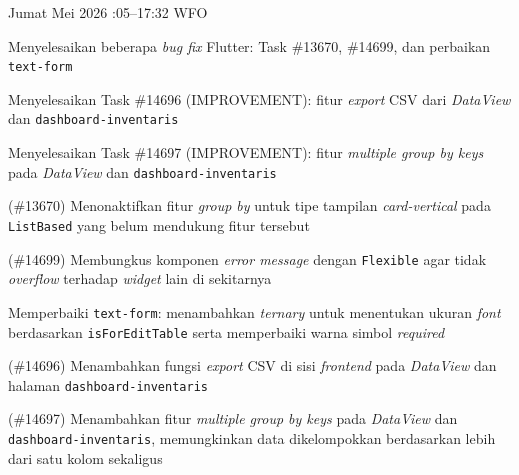 \begin{logtable}
    {
        Jumat  Mei 2026 :05--17:32 \linebreak %
        WFO
    }{
        \begin{loglist}
            \item Menyelesaikan beberapa \textit{bug fix} Flutter: Task \#13670, \#14699, dan
            perbaikan \texttt{text-form}
            \item Menyelesaikan Task \#14696 (IMPROVEMENT): fitur \textit{export} CSV dari
            \textit{DataView} dan \texttt{dashboard-inventaris}
            \item Menyelesaikan Task \#14697 (IMPROVEMENT): fitur \textit{multiple group by keys}
            pada \textit{DataView} dan \texttt{dashboard-inventaris}
        \end{loglist}
    }{
        \begin{logwork}
            \item (\#13670) Menonaktifkan fitur \textit{group by} untuk tipe tampilan \textit{card-vertical} pada \texttt{ListBased} yang belum mendukung fitur tersebut
            \item (\#14699) Membungkus komponen \textit{error message} dengan \texttt{Flexible} agar tidak \textit{overflow} terhadap \textit{widget} lain di sekitarnya
            \item Memperbaiki \texttt{text-form}: menambahkan \textit{ternary} untuk menentukan
            ukuran \textit{font} berdasarkan \texttt{isForEditTable} serta memperbaiki
            warna simbol \textit{required}
            \item (\#14696) Menambahkan fungsi \textit{export} CSV di sisi \textit{frontend} pada \textit{DataView} dan halaman \texttt{dashboard-inventaris}
            \item (\#14697) Menambahkan fitur \textit{multiple group by keys} pada \textit{DataView} dan \texttt{dashboard-inventaris}, memungkinkan data dikelompokkan berdasarkan lebih dari satu kolom sekaligus
        \end{logwork}
    }

\end{logtable}

